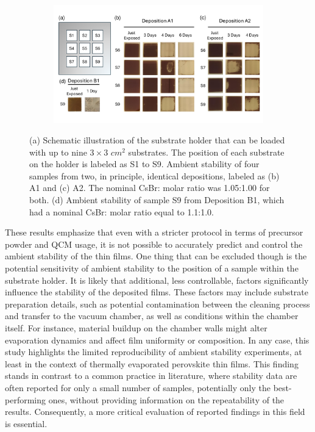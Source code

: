 \begin{figure}[htbp]
    \centering
    \begin{subfigure}[t]{0.99\textwidth}
        \centering
        \includegraphics[width=\textwidth]{chapters/stability/imeges/Stability - Rotation.pdf} %
    \end{subfigure}
    \caption[Variability of  films' ambient stability across different positions on the substrate holder and different deposition runs.]{(a) Schematic illustration of the substrate holder that can be loaded with up to nine $3\times 3$ $cm^2$ substrates. The position of each substrate on the holder is labeled as S1 to S9. Ambient stability of four samples from two, in principle, identical depositions, labeled as (b) A1 and (c) A2. The nominal CsBr: molar ratio was 1.05:1.00 for both. (d) Ambient stability of sample S9 from Deposition B1, which had a nominal CsBr: molar ratio equal to 1.1:1.0.}
    \label{fig:stability:repeatability}
\end{figure}

These results emphasize that even with a stricter protocol in terms of precursor powder and QCM usage, it is not possible to accurately predict and control the ambient stability of the  thin films. One thing that can be excluded though is the potential sensitivity of ambient stability to the position of a sample within the substrate holder. It is likely that additional, less controllable, factors significantly influence the stability of the deposited films. These factors may include substrate preparation details, such as potential contamination between the cleaning process and transfer to the vacuum chamber, as well as conditions within the chamber itself. For instance, material buildup on the chamber walls might alter evaporation dynamics and affect film uniformity or composition. In any case, this study highlights the limited reproducibility of ambient stability experiments, at least in the context of thermally evaporated perovskite thin films. This finding stands in contrast to a common practice in literature, where stability data are often reported for only a small number of samples, potentially only the best-performing ones, without providing information on the repeatability of the results. Consequently, a more critical evaluation of reported findings in this field is essential.

